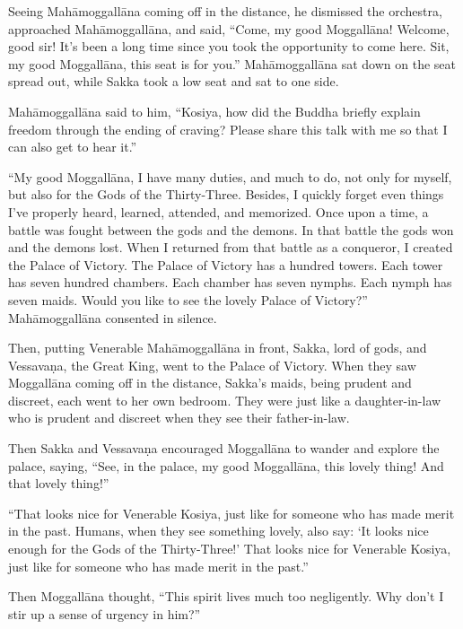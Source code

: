 \documentclass[12pt,openany]{book}%
\begin{document}
Seeing \textsanskrit{Mahāmoggallāna} coming off in the distance, he dismissed the orchestra, approached \textsanskrit{Mahāmoggallāna}, and said, “Come, my good \textsanskrit{Moggallāna}! Welcome, good sir! It’s been a long time since you took the opportunity to come here. Sit, my good \textsanskrit{Moggallāna}, this seat is for you.” \textsanskrit{Mahāmoggallāna} sat down on the seat spread out, while Sakka took a low seat and sat to one side. 

\textsanskrit{Mahāmoggallāna} said to him, “Kosiya, how did the Buddha briefly explain freedom through the ending of craving? Please share this talk with me so that I can also get to hear it.” 

“My good \textsanskrit{Moggallāna}, I have many duties, and much to do, not only for myself, but also for the Gods of the Thirty-Three. Besides, I quickly forget even things I’ve properly heard, learned, attended, and memorized. Once upon a time, a battle was fought between the gods and the demons. In that battle the gods won and the demons lost. When I returned from that battle as a conqueror, I created the Palace of Victory. The Palace of Victory has a hundred towers. Each tower has seven hundred chambers. Each chamber has seven nymphs. Each nymph has seven maids. Would you like to see the lovely Palace of Victory?” \textsanskrit{Mahāmoggallāna} consented in silence. 

Then, putting Venerable \textsanskrit{Mahāmoggallāna} in front, Sakka, lord of gods, and \textsanskrit{Vessavaṇa}, the Great King, went to the Palace of Victory. When they saw \textsanskrit{Moggallāna} coming off in the distance, Sakka’s maids, being prudent and discreet, each went to her own bedroom. They were just like a daughter-in-law who is prudent and discreet when they see their father-in-law. 

Then Sakka and \textsanskrit{Vessavaṇa} encouraged \textsanskrit{Moggallāna} to wander and explore the palace, saying, “See, in the palace, my good \textsanskrit{Moggallāna}, this lovely thing! And that lovely thing!” 

“That looks nice for Venerable Kosiya, just like for someone who has made merit in the past. Humans, when they see something lovely, also say: ‘It looks nice enough for the Gods of the Thirty-Three!’ That looks nice for Venerable Kosiya, just like for someone who has made merit in the past.” 

Then \textsanskrit{Moggallāna} thought, “This spirit lives much too negligently. Why don’t I stir up a sense of urgency in him?” 
\end{document}
